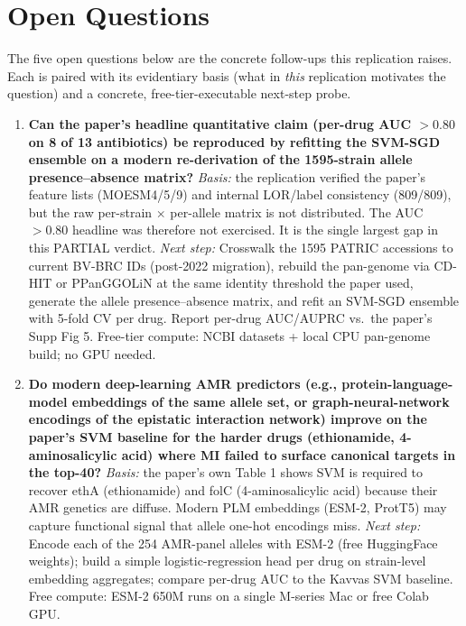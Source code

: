 \section{Open Questions}

The five open questions below are the concrete follow-ups this replication raises. Each is
paired with its evidentiary basis (what in \emph{this} replication motivates the question) and
a concrete, free-tier-executable next-step probe.

\begin{enumerate}[leftmargin=1.6em,itemsep=0.6em]

\item \textbf{Can the paper's headline quantitative claim (per-drug AUC $>0.80$ on 8 of 13
antibiotics) be reproduced by refitting the SVM-SGD ensemble on a modern re-derivation of the
1595-strain allele presence--absence matrix?}
\emph{Basis:} the replication verified the paper's feature lists (MOESM4/5/9) and internal
LOR/label consistency (809/809), but the raw per-strain $\times$ per-allele matrix is not
distributed. The AUC $>0.80$ headline was therefore not exercised. It is the single largest
gap in this PARTIAL verdict.
\emph{Next step:} Crosswalk the 1595 PATRIC accessions to current BV-BRC IDs (post-2022
migration), rebuild the pan-genome via CD-HIT or PPanGGOLiN at the same identity threshold
the paper used, generate the allele presence--absence matrix, and refit an SVM-SGD ensemble
with 5-fold CV per drug. Report per-drug AUC/AUPRC vs.\ the paper's Supp Fig 5. Free-tier
compute: NCBI datasets + local CPU pan-genome build; no GPU needed.

\item \textbf{Do modern deep-learning AMR predictors (e.g., protein-language-model
embeddings of the same allele set, or graph-neural-network encodings of the epistatic
interaction network) improve on the paper's SVM baseline for the harder drugs (ethionamide,
4-aminosalicylic acid) where MI failed to surface canonical targets in the top-40?}
\emph{Basis:} the paper's own Table 1 shows SVM is required to recover ethA (ethionamide)
and folC (4-aminosalicylic acid) because their AMR genetics are diffuse. Modern PLM embeddings
(ESM-2, ProtT5) may capture functional signal that allele one-hot encodings miss.
\emph{Next step:} Encode each of the 254 AMR-panel alleles with ESM-2 (free HuggingFace
weights); build a simple logistic-regression head per drug on strain-level embedding
aggregates; compare per-drug AUC to the Kavvas SVM baseline. Free compute: ESM-2 650M runs
on a single M-series Mac or free Colab GPU.


\end{enumerate}
